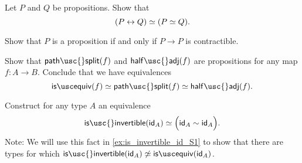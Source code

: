 \begin{exercises}
\begin{subexenum}
\item Let $P$ and $Q$ be propositions. Show that
\begin{equation*}
\eqv{(P\leftrightarrow Q)}{(\eqv{P}{Q})}.
\end{equation*}
\item Show that $P$ is a proposition if and only if $P\to P$ is contractible.
\end{subexenum}
\item Show that $\mathsf{path\usc{}split}(f)$ and $\mathsf{half\usc{}adj}(f)$ are propositions for any map $f:A\to B$. Conclude that we have equivalences
  \begin{equation*}
    \isequiv(f) \eqvsym \mathsf{path\usc{}split}(f) \eqvsym \mathsf{half\usc{}adj}(f).
  \end{equation*}
\item \label{ex:idfunc_autohtpy}Construct for any type $A$ an equivalence
\begin{equation*}
\eqv{\mathsf{is\usc{}invertible}(\idfunc[A])}{\Big(\idfunc[A]\htpy\idfunc[A]\Big)}.
\end{equation*}
Note: We will use this fact in \cref{ex:is_invertible_id_S1} to show that there
are types for which $\mathsf{is\usc{}invertible}(\idfunc[A])\not\eqvsym\isequiv(\idfunc[A])$.
\item 

\end{exercises}

